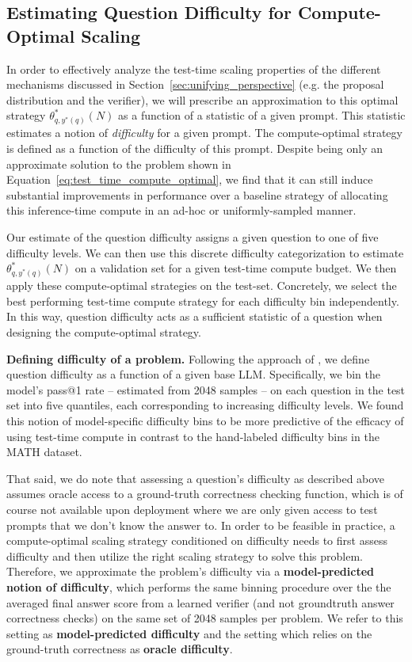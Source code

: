 \documentclass[11pt, letterpaper, logo]{googledeepmind}
\begin{document}
\subsection{Estimating Question Difficulty for Compute-Optimal Scaling} 
\vspace{-0.2cm}
In order to effectively analyze the test-time scaling properties of the different mechanisms discussed in Section~\ref{sec:unifying_perspective} (e.g. the proposal distribution and the verifier), we will prescribe an approximation to this optimal strategy $\theta^{*}_{q,y^*(q)}(N)$ as a function of a statistic of a given prompt. This statistic estimates a notion of \emph{difficulty} for a given prompt. The compute-optimal strategy is defined as a function of the difficulty of this prompt. Despite being only an approximate solution to the problem shown in Equation~\ref{eq:test_time_compute_optimal}, we find that it can still induce substantial improvements in performance over a baseline strategy of allocating this inference-time compute in an ad-hoc or uniformly-sampled manner.

Our estimate of the question difficulty assigns a given question to one of five difficulty levels. We can then use this discrete difficulty categorization to estimate $\theta^{*}_{q,y^*(q)}(N)$ on a validation set for a given test-time compute budget. We then apply these compute-optimal strategies on the test-set. Concretely, we select the best performing test-time compute strategy for each difficulty bin independently. In this way, question difficulty acts as a sufficient statistic of a question when designing the compute-optimal strategy.

\textbf{Defining difficulty of a problem.} Following the approach of \citet{lightman2023lets}, we define question difficulty as a function of a given base LLM. Specifically, we bin the model's pass@1 rate -- estimated from 2048 samples -- on each question in the test set into five quantiles, each corresponding to increasing difficulty levels. We found this notion of model-specific difficulty bins to be more predictive of the efficacy of using test-time compute in contrast to the hand-labeled difficulty bins in the MATH dataset.

That said, we do note that assessing a question's difficulty as described above assumes oracle access to a ground-truth correctness checking function, which is of course not available upon deployment where we are only given access to test prompts that we don't know the answer to. In order to be feasible in practice, a compute-optimal scaling strategy conditioned on difficulty needs to first assess difficulty and then utilize the right scaling strategy to solve this problem.
Therefore, we approximate the problem's difficulty via a \textbf{model-predicted notion of difficulty}, which performs the same binning procedure over the the averaged final answer score from a learned verifier (and not groundtruth answer correctness checks) on the same set of 2048 samples per problem. We refer to this setting as \textbf{model-predicted difficulty} and the setting which relies on the ground-truth correctness as \textbf{oracle difficulty}.
\end{document}
